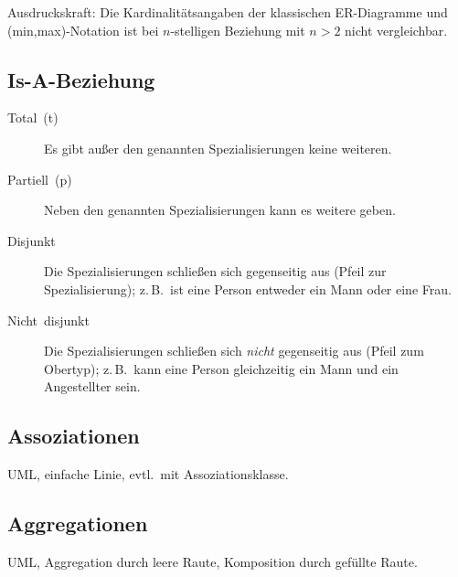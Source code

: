 Ausdruckskraft: Die Kardinalitätsangaben der klassischen ER-Diagramme
und (min,max)-Notation ist bei $n$-stelligen Beziehung mit $n>2$
nicht vergleichbar.



\subsection{Is-A-Beziehung}
\begin{description}
\item [{Total~(t)}] Es gibt außer den genannten Spezialisierungen keine
weiteren.
\item [{Partiell~(p)}] Neben den genannten Spezialisierungen kann es weitere
geben.
\item [{Disjunkt}] Die Spezialisierungen schließen sich gegenseitig aus
(Pfeil zur Spezialisierung); z.\,B.~ist eine Person entweder ein
Mann oder eine Frau.
\item [{Nicht~disjunkt}] Die Spezialisierungen schließen sich \emph{nicht}
gegenseitig aus (Pfeil zum Obertyp); z.\,B.~kann eine Person gleichzeitig
ein Mann und ein Angestellter sein.
\end{description}


\subsection{Assoziationen}

UML, einfache Linie, evtl.~mit Assoziationsklasse.



\subsection{Aggregationen}

UML, Aggregation durch leere Raute, Komposition durch gefüllte Raute.



